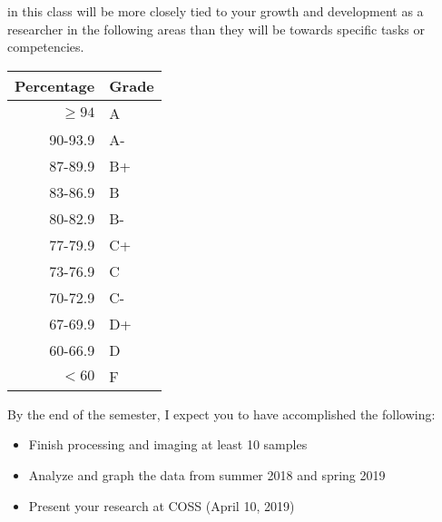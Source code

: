\documentclass{tufte-handout}
\begin{document}

 in this class will be more closely tied to your growth and development as a researcher in the following areas than they will be towards specific tasks or competencies. 

\begin{margintable}
\begin{tabular}{rl}
Percentage & Grade \\
\hline 
$\ge94$ & A \\
90-93.9 & A- \\
87-89.9 & B+ \\
83-86.9 & B \\
80-82.9 & B- \\
77-79.9 & C+ \\
73-76.9 & C \\
70-72.9 & C- \\
67-69.9 & D+ \\
60-66.9 & D \\
$<60$ & F \\
\hline
\end{tabular}
\end{margintable}



By the end of the semester, I expect you to have accomplished the following:

\begin{itemize}
	\item Finish processing and imaging at least 10 samples
	\item Analyze and graph the data from summer 2018 and spring 2019
	\item Present your research at COSS (April 10, 2019)
\end{itemize}
\end{document}
